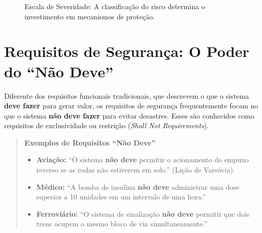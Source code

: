 \documentclass[12pt,a4paper]{report}
\begin{document}
\begin{figure}[h]
    \centering
    \caption{Escala de Severidade: A classificação do risco determina o investimento em mecanismos de proteção.}
\end{figure}

\section{Requisitos de Segurança: O Poder do ``Não Deve''}

Diferente dos requisitos funcionais tradicionais, que descrevem o que o sistema \textbf{deve fazer} para gerar valor, os requisitos de segurança frequentemente focam no que o sistema \textbf{não deve fazer} para evitar desastres. Esses são conhecidos como requisitos de exclusividade ou restrição (\emph{Shall Not Requirements}).

\begin{quote}
\textbf{Exemplos de Requisitos ``Não Deve''}
    \begin{itemize}
        \item \textbf{Aviação:} ``O sistema \textbf{não deve} permitir o acionamento do empuxo reverso se as rodas não estiverem em solo.'' (Lição de Varsóvia).
        \item \textbf{Médico:} ``A bomba de insulina \textbf{não deve} administrar uma dose superior a 10 unidades em um intervalo de uma hora.''
        \item \textbf{Ferroviário:} ``O sistema de sinalização \textbf{não deve} permitir que dois trens ocupem o mesmo bloco de via simultaneamente.''
    \end{itemize}
\end{quote}
\end{document}
